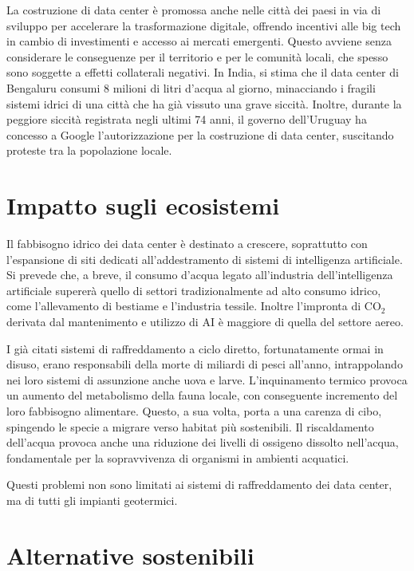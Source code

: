 \documentclass[12pt,a4paper,oneside]{book}
\begin{document}
La costruzione di data center è promossa anche nelle città dei paesi in via di sviluppo per accelerare la trasformazione digitale, offrendo incentivi alle big tech in cambio di investimenti e accesso ai mercati emergenti. Questo avviene senza considerare le conseguenze per il territorio e per le comunità locali, che spesso sono soggette a effetti collaterali negativi.
In India, si stima che il data center di Bengaluru consumi 8 milioni di litri d'acqua al giorno, minacciando i fragili sistemi idrici di una città che ha già vissuto una grave siccità.
Inoltre, durante la peggiore siccità registrata negli ultimi 74 anni, il governo dell'Uruguay ha concesso a Google l'autorizzazione per la costruzione di data center, suscitando proteste tra la popolazione locale.

\section{Impatto sugli ecosistemi}
Il fabbisogno idrico dei data center è destinato a crescere, soprattutto con l'espansione di siti dedicati all'addestramento di sistemi di intelligenza artificiale. Si prevede che, a breve, il consumo d'acqua legato all'industria dell'intelligenza artificiale supererà quello di settori tradizionalmente ad alto consumo idrico, come l'allevamento di bestiame e l'industria tessile. Inoltre l'impronta di CO$_2$ derivata dal mantenimento e utilizzo di AI è maggiore di quella del settore aereo.

I già citati sistemi di raffreddamento a ciclo diretto, fortunatamente ormai in disuso, erano responsabili della morte di miliardi di pesci all'anno, intrappolando nei loro sistemi di assunzione anche uova e larve. L'inquinamento termico provoca un aumento del metabolismo della fauna locale, con conseguente incremento del loro fabbisogno alimentare. Questo, a sua volta, porta a una carenza di cibo, spingendo le specie a migrare verso habitat più sostenibili. Il riscaldamento dell'acqua provoca anche una riduzione dei livelli di ossigeno dissolto nell'acqua, fondamentale per la sopravvivenza di organismi in ambienti acquatici.

Questi problemi non sono limitati ai sistemi di raffreddamento dei data center, ma di tutti gli impianti geotermici.

\section{Alternative sostenibili}
\end{document}
